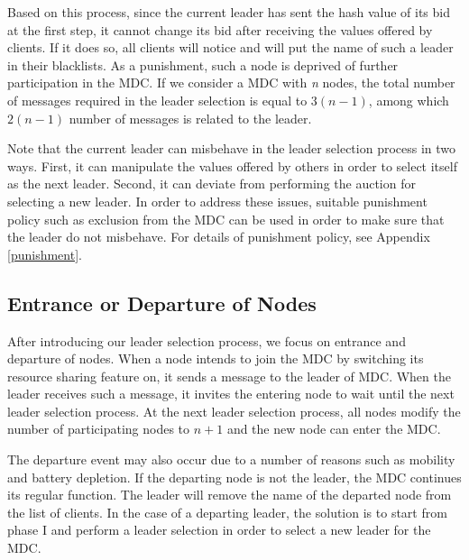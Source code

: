\documentclass[journal,12pt, onecolumn]{IEEEtran}
\begin{document}
Based on this process, since the current leader has sent the hash value of its bid at the first step, it cannot change its bid after receiving the values offered by clients. If it does so, all clients will notice and will put the name of such a leader in their blacklists. As a punishment, such a node is deprived of further participation in the MDC. If we consider a MDC with \textit{n} nodes, the total number of messages required in the leader selection is equal to $3(n-1)$, among which $2(n-1)$ number of messages is related to the leader. 

Note that the current leader can misbehave in the leader selection process in two ways. First, it can manipulate the values offered by others in order to select itself as the next leader. Second, it can deviate from performing the auction for selecting a new leader. In order to address these issues, suitable punishment policy such as exclusion from the MDC can be used in order to make sure that the leader do not misbehave. For details of punishment policy, see Appendix \ref{punishment}.







 





\subsection{Entrance or Departure of Nodes}\label{section:entrance}
After introducing our leader selection process, we focus on entrance and departure of nodes. When a node intends to join the MDC by switching its resource sharing feature on, it sends a message to the leader of MDC. When the leader receives such a message, it invites the entering node to wait until the next leader selection process. At the next leader selection process, all nodes modify the number of participating nodes to $n+1$ and the new node can enter the MDC.


The departure event may also occur due to a number of reasons such as mobility and battery depletion. If the departing node is not the leader, the MDC continues its regular function. The leader will remove the name of the departed node from the list of clients. 
In the case of a departing leader, the solution is to start from phase I and perform a leader selection in order to select a new leader for the MDC. 
\end{document}
